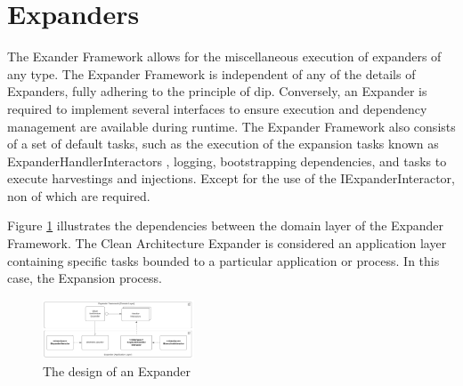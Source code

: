 \section{Expanders}

The Exander Framework allows for the miscellaneous execution of expanders of any type. The
Expander Framework is independent of any of the details of Expanders, fully adhering to
the principle of \gls{dip}. Conversely, an Expander is required to implement several
interfaces to ensure execution and dependency management are available during runtime. The
Expander Framework also consists of a set of default tasks, such as the execution of the
expansion tasks known as ExpanderHandlerInteractors
, logging, bootstrapping dependencies, and
tasks to execute harvestings and injections. Except for the use of the
IExpanderInteractor, non of which are required.

Figure \ref{fig_expander_design} illustrates the dependencies between the domain layer of
the Expander Framework. The Clean Architecture Expander is considered an application layer
containing specific tasks bounded to a particular application or process. In this case,
the Expansion process.

\begin{figure}[htbp]
    \centering
    \includegraphics[width=0.4\textwidth]{figures/expander.pdf}
    \caption[The design of an Expander]{The design of an Expander}
    \label{fig_expander_design}
  \end{figure}